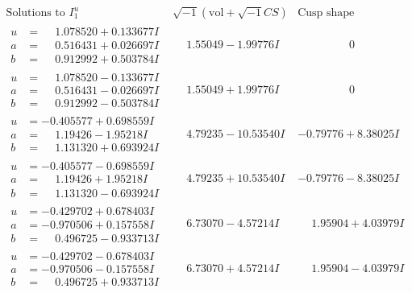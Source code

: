 \documentclass[1p]{elsarticle_modified}
\theoremstyle{definition}
\newcommand{\I}{\sqrt{-1}}
\begin{document}
$$\begin{array}{c|c|c}  
\text{Solutions to }I^u_{1}& \I (\text{vol} + \sqrt{-1}CS) & \text{Cusp shape}\\
 \hline 
\begin{aligned}
u &= \phantom{-}1.078520 + 0.133677 I \\
a &= \phantom{-}0.516431 + 0.026697 I \\
b &= \phantom{-}0.912992 + 0.503784 I\end{aligned}
 & \phantom{-}1.55049 - 1.99776 I & \phantom{-0.000000 } 0 \\ \hline\begin{aligned}
u &= \phantom{-}1.078520 - 0.133677 I \\
a &= \phantom{-}0.516431 - 0.026697 I \\
b &= \phantom{-}0.912992 - 0.503784 I\end{aligned}
 & \phantom{-}1.55049 + 1.99776 I & \phantom{-0.000000 } 0 \\ \hline\begin{aligned}
u &= -0.405577 + 0.698559 I \\
a &= \phantom{-}1.19426 - 1.95218 I \\
b &= \phantom{-}1.131320 + 0.693924 I\end{aligned}
 & \phantom{-}4.79235 - 10.53540 I & -0.79776 + 8.38025 I \\ \hline\begin{aligned}
u &= -0.405577 - 0.698559 I \\
a &= \phantom{-}1.19426 + 1.95218 I \\
b &= \phantom{-}1.131320 - 0.693924 I\end{aligned}
 & \phantom{-}4.79235 + 10.53540 I & -0.79776 - 8.38025 I \\ \hline\begin{aligned}
u &= -0.429702 + 0.678403 I \\
a &= -0.970506 + 0.157558 I \\
b &= \phantom{-}0.496725 - 0.933713 I\end{aligned}
 & \phantom{-}6.73070 - 4.57214 I & \phantom{-}1.95904 + 4.03979 I \\ \hline\begin{aligned}
u &= -0.429702 - 0.678403 I \\
a &= -0.970506 - 0.157558 I \\
b &= \phantom{-}0.496725 + 0.933713 I\end{aligned}
 & \phantom{-}6.73070 + 4.57214 I & \phantom{-}1.95904 - 4.03979 I \\ \hline\begin{aligned}

\end{aligned}
\end{array}$$
\end{document}
